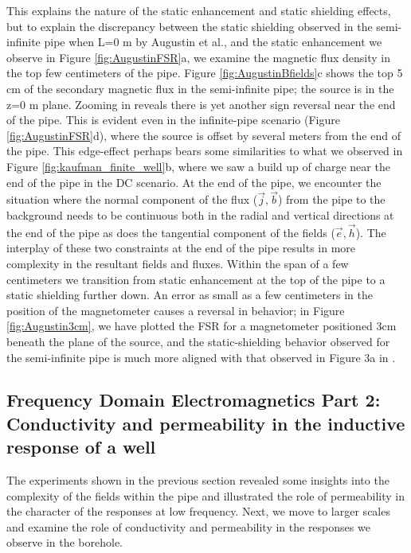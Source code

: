 \documentclass[preprint,review,3p,times,onecolumn,authoryear]{elsarticle}
\begin{document}
This explains the nature of the static enhancement and static shielding effects, but to explain the discrepancy between the static shielding observed in the semi-infinite pipe when L=0 m by Augustin et al., and the static enhancement we observe in Figure \ref{fig:AugustinFSR}a, we examine the magnetic flux density in the top few centimeters of the pipe. Figure \ref{fig:AugustinBfields}c shows the top 5 cm of the secondary magnetic flux in the semi-infinite pipe; the source is in the z=0 m plane.  Zooming in reveals there is yet another sign reversal near the end of the pipe. This is evident even in the infinite-pipe scenario (Figure \ref{fig:AugustinFSR}d), where the source is offset by several meters from the end of the pipe. This edge-effect perhaps bears some similarities to what we observed in Figure \ref{fig:kaufman_finite_well}b, where we saw a build up of charge near the end of the pipe in the DC scenario. At the end of the pipe, we encounter the situation where the normal component of the flux ($\vec{j}, \vec{b}$) from the pipe to the background needs to be continuous both in the radial and vertical directions at the end of the pipe as does the tangential component of the fields ($\vec{e}, \vec{h}$). The interplay of these two constraints at the end of the pipe results in more complexity in the resultant fields and fluxes. Within the span of a few centimeters we transition from static enhancement at the top of the pipe to a static shielding further down. An error as small as a few centimeters in the position of the magnetometer causes a reversal in behavior; in Figure \ref{fig:Augustin3cm}, we have plotted the FSR for a magnetometer positioned 3cm beneath the plane of the source, and the static-shielding behavior observed for the semi-infinite pipe is much more aligned with that observed in Figure 3a in \cite{Augustin1989}.








\subsection{Frequency Domain Electromagnetics Part 2: Conductivity and permeability in the inductive response of a well}
\label{sec:FDEM_part2}

The experiments shown in the previous section revealed some insights into the complexity of the fields within the pipe and illustrated the role of permeability in the character of the responses at low frequency. Next, we move to larger scales and examine the role of conductivity and permeability in the responses we observe in the borehole.
\end{document}
